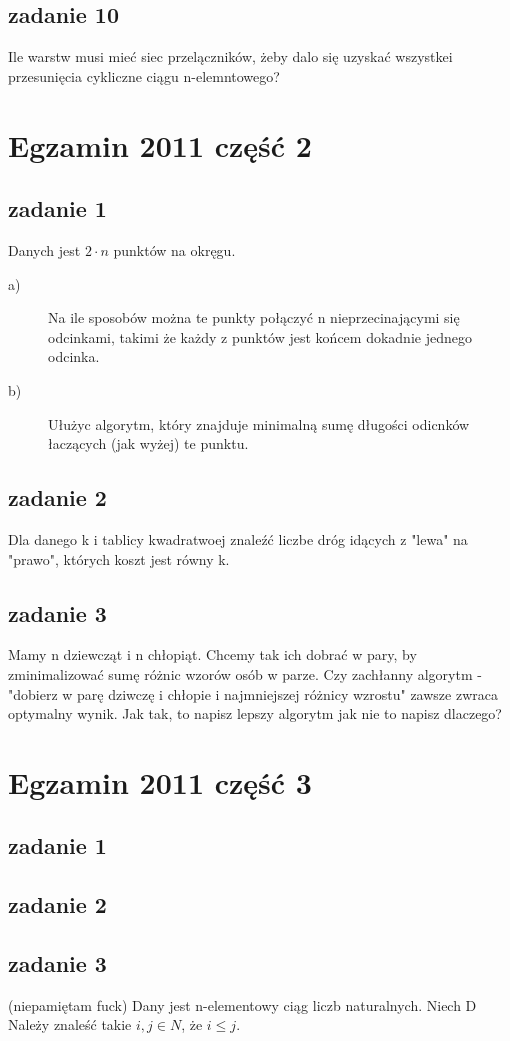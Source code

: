 \section{zadanie 10}
Ile warstw musi mieć siec przelączników, żeby dalo się uzyskać wszystkei przesunięcia cykliczne ciągu n-elemntowego?

\chapter{Egzamin 2011 część 2}

\section{zadanie 1}
Danych jest $2 \cdot n$ punktów na okręgu.
\begin{description}
	\item[a)] Na ile sposobów można te punkty połączyć n nieprzecinającymi się odcinkami, takimi że każdy z punktów jest końcem dokadnie jednego odcinka.
	\item[b)] Ułużyc algorytm, który znajduje minimalną sumę długości odicnków łaczących (jak wyżej) te punktu.
\end{description}

\section{zadanie 2}
Dla danego k i tablicy kwadratwoej znaleźć liczbe dróg idących z "lewa" na "prawo", których koszt jest równy k.

\section{zadanie 3}
Mamy n dziewcząt i n chłopiąt. Chcemy tak ich dobrać w pary, by zminimalizować sumę różnic wzorów osób w parze.
Czy zachłanny algorytm - "dobierz w parę dziwczę i chłopie i najmniejszej różnicy wzrostu" zawsze zwraca optymalny wynik.
Jak tak, to napisz lepszy algorytm jak nie to napisz dlaczego?

\chapter{Egzamin 2011 część 3}

\section{zadanie 1}

\section{zadanie 2}

\section{zadanie 3} (niepamiętam fuck)
Dany jest n-elementowy ciąg liczb naturalnych. 
Niech D
Należy znaleść takie $i,j \in N$, że $i \leqslant j$.

